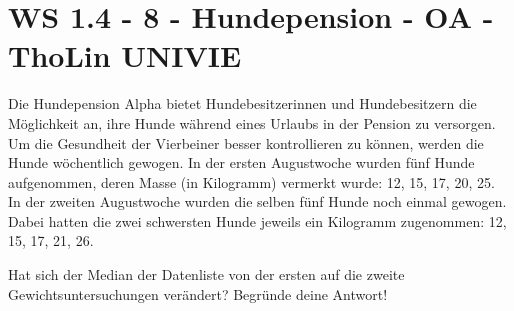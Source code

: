 \section{WS 1.4 - 8 - Hundepension - OA - ThoLin UNIVIE}

\begin{beispiel}[WS 1.4]{1}
Die Hundepension Alpha bietet Hundebesitzerinnen und Hundebesitzern die Möglichkeit an, ihre Hunde während eines Urlaubs in der Pension zu versorgen. Um die Gesundheit der Vierbeiner besser kontrollieren zu können, werden die Hunde wöchentlich gewogen. In der ersten Augustwoche wurden fünf Hunde aufgenommen, deren Masse (in Kilogramm) vermerkt wurde: 12, 15, 17, 20, 25.\\
In der zweiten Augustwoche wurden die selben fünf Hunde noch einmal gewogen. Dabei hatten die zwei schwersten Hunde jeweils ein Kilogramm zugenommen: 12, 15, 17, 21, 26.

Hat sich der Median der Datenliste von der ersten auf die zweite Gewichtsuntersuchungen verändert? Begründe deine Antwort!

\leer

\end{beispiel}